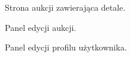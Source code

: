 \begin{figure}[h]
\centering
{}
\caption{Strona aukcji zawierająca detale.}
\label{screen05}
\end{figure}

\begin{figure}[h]
\centering
{}
\caption{Panel edycji aukcji.}
\label{screen06}
\end{figure}

\begin{figure}[h]
\centering
{}
\caption{Panel edycji profilu użytkownika.}
\label{screen07}
\end{figure}

